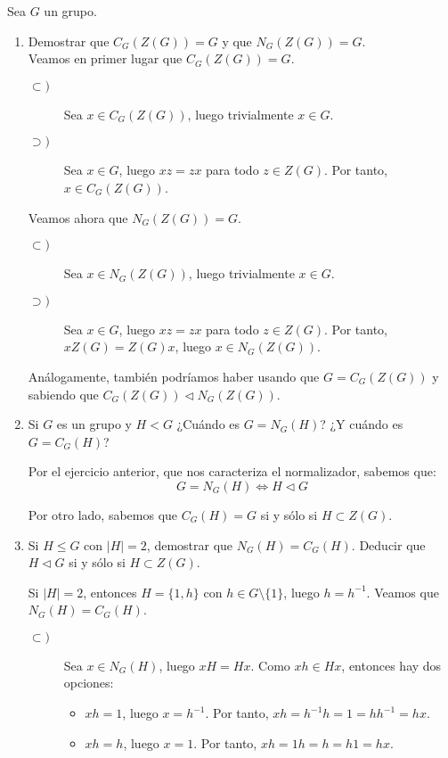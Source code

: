 \begin{ejercicio} Sea $G$ un grupo.
    \begin{enumerate}
        \item Demostrar que $C_G(Z(G))=G$ y que $N_G(Z(G))=G$.\\
        
        Veamos en primer lugar que $C_G(Z(G))=G$.
        \begin{description}
            \item[$\subset)$] Sea $x\in C_G(Z(G))$, luego trivialmente $x\in G$.
            \item[$\supset)$] Sea $x\in G$, luego $xz=zx$ para todo $z\in Z(G)$. Por tanto, $x\in C_G(Z(G))$. 
        \end{description}

        Veamos ahora que $N_G(Z(G))=G$.
        \begin{description}
            \item[$\subset)$] Sea $x\in N_G(Z(G))$, luego trivialmente $x\in G$.
            \item[$\supset)$] Sea $x\in G$, luego $xz=zx$ para todo $z\in Z(G)$. Por tanto, $xZ(G)=Z(G)x$, luego $x\in N_G(Z(G))$.
        \end{description}
        Análogamente, también podríamos haber usando que $G=C_G(Z(G))$ y sabiendo que $C_G(Z(G))\lhd N_G(Z(G))$.
        \item Si $G$ es un grupo y $H<G$ ¿Cuándo es $G=N_G(H)$? ¿Y cuándo es $G=C_G(H)$?
        
        Por el ejercicio anterior, que nos caracteriza el normalizador, sabemos que:
        \begin{equation*}
            G=N_G(H) \Longleftrightarrow H\lhd G
        \end{equation*}

        Por otro lado, sabemos que $C_G(H)=G$ si y sólo si $H\subset Z(G)$.
        \item Si $H\leq G$ con $|H|=2$, demostrar que $N_G(H)=C_G(H)$. Deducir que $H\lhd G$ si y sólo si $H\subset Z(G)$.
        
        Si $|H|=2$, entonces $H=\{1,h\}$ con $h\in G\setminus \{1\}$, luego $h=h^{-1}$. Veamos que $N_G(H)=C_G(H)$.
        \begin{description}
            \item[$\subset)$] Sea $x\in N_G(H)$, luego $xH=Hx$. Como $xh\in Hx$, entonces hay dos opciones:
            \begin{itemize}
                \item $xh=1$, luego $x=h^{-1}$. Por tanto, $xh=h^{-1}h=1=hh^{-1}=hx$.
                \item $xh=h$, luego $x=1$. Por tanto, $xh=1h=h=h1=hx$.
            \end{itemize}


\end{description}
\end{enumerate}
\end{ejercicio}
